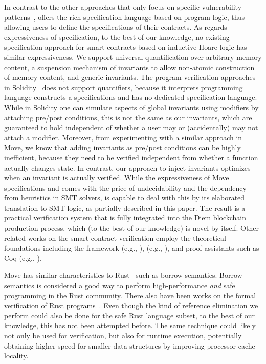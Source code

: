 In contrast to the other approaches that only focus on specific vulnerability patterns~\cite{mythril,oyente,maian,securify}, \MVP offers the rich specification language based on program logic, thus allowing users to define the specifications of their contracts.
As regards expressiveness of specification, to the best of our knowledge, no
existing specification approach for smart contracts based on inductive Hoare
logic has similar expressiveness. We support universal quantification over
arbitrary memory content, a suspension mechanism of invariants to allow
non-atomic construction of memory content, and generic invariants.
%
The program verification
approaches in Solidity~\cite{solcverify,DBLP:conf/esop/HajduJ20,verisol} does not support quantifiers, because it
interprets programming language constructs a specifications and has no
dedicated specification language. While in Solidity one can simulate aspects of
global invariants using modifiers by attaching pre/post conditions, this is not
the same as our invariants, which are guaranteed to hold independent of whether
a user may or (accidentally) may not attach a modifier.  Moreover, from
experimenting with a similar approach in Move, we know that adding invariants as
pre/post conditions can be highly inefficient, because they need to be verified
independent from whether a function actually changes state. In contrast, our
approach to inject invariants optimizes when an invariant is actually verified.
While the expressiveness of Move specifications and \MVP comes with the price of
undecidability and the dependency from heuristics in SMT solvers, \MVP is
capable to deal with this by its elaborated translation to SMT logic, as
partially described in this paper. The result is a practical verification system
that is fully integrated into the Diem blockchain production process, which (to
the best of our knowledge) is novel by itself. Other related works on the \solidity smart contract verification employ the theoretical foundations including the \kay framework \cite{kay} (e.g., \cite{kevm}), \fstar \cite{dm4all} (e.g., \cite{DBLP:conf/ccs/BhargavanDFGGKK16,post2018}), and proof assistants such as Coq \cite{coqref} (e.g., \cite{fspvme,fether}).

Move has similar characteristics to Rust~\cite{rust} such as borrow semantics. Borrow semantics is considered a good way to perform high-performance \emph{and} safe programming in the Rust community. There also have been works on the formal verification of Rust programs~\cite{prusti,smack,nopanic,crust}.
Even though the kind of reference
elimination we perform could also be done for the safe Rust language subset, to
the best of our knowledge, this has not been attempted before. The same
technique could likely not only be used for verification, but also for runtime
execution, potentially obtaining higher speed for smaller data structures by
improving processor cache locality.

